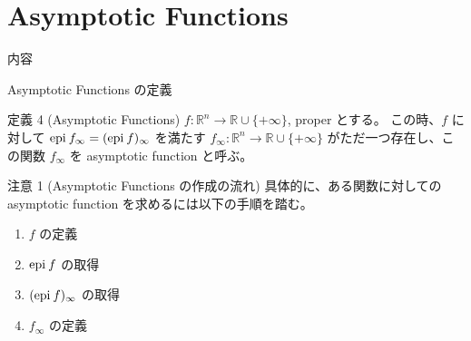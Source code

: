 \documentclass[aspectratio=169, dvipdfmx, 11pt]{beamer} %
\newcommand{\RealNumberSet}{\mathbb{R}}
\newcommand{\NDemenstionalRealEuclideanSpace}{\mathbb{R}^n}
\newcommand{\Epigraph}[1]{\text{epi\:${#1}$}} %
\begin{document}
\section{Asymptotic Functions}
\begin{frame}{内容}
  \tableofcontents[currentsection]
\end{frame}

\begin{frame}{Asymptotic Functions の定義}
  \begin{block}{定義 4 (Asymptotic Functions) \cite{ref1}}
    $f: \NDemenstionalRealEuclideanSpace \rightarrow \RealNumberSet \cup \{+\infty\}$, proper とする。
    この時、$f$ に対して $\Epigraph{f_{\infty}} = (\Epigraph{f})_{\infty}$ を満たす $f_{\infty}: \NDemenstionalRealEuclideanSpace \rightarrow \RealNumberSet \cup \{+\infty\}$ がただ一つ存在し、この関数 $f_{\infty}$ を asymptotic function と呼ぶ。
  \end{block}

  \pause
  \begin{alertblock}{注意 1 (Asymptotic Functions の作成の流れ)}
    具体的に、ある関数に対しての asymptotic function を求めるには以下の手順を踏む。
    \begin{enumerate}
      \item $f$ の定義
      \item $\Epigraph{f}$ の取得
      \item $(\Epigraph{f})_{\infty}$ の取得
      \item $f_{\infty}$ の定義
    \end{enumerate}
  \end{alertblock}
\end{frame}
\end{document}

